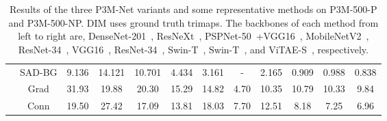 \documentclass[twocolumn]{svjour3}
\begin{document}
\begin{table*}[htb]
\begin{center}
{\begin{tabular}{c|c|ccccc|c|cccc}
&SAD-BG & 9.136&14.121 &10.701 &4.434&3.161  & - &2.165 & 0.909 & 0.988 & 0.838 \\
&Grad & 31.93& 19.88& 20.30&15.29 &14.82 &4.70 &10.35 & 10.79 & 10.33 & 9.84 \\
&Conn & 19.50& 27.42& 17.09&13.81& 18.03& 7.70& 12.51& 8.18 & 7.25 & 6.96 \\
\hline
\end{tabular}}
\end{center}
\caption{Results of the three P3M-Net variants and some representative methods on P3M-500-P and P3M-500-NP. DIM uses ground truth trimaps. The backbones of each method from left to right are, DenseNet-201~\citep{huang2017densely}, ResNeXt~\citep{resnext}, PSPNet-50~\citep{zhao2017pyramid}+VGG16~\citep{vgg16}, MobileNetV2~\citep{mobilenetv2}, ResNet-34~\citep{he2016deep}, VGG16~\citep{vgg16}, ResNet-34~\citep{he2016deep}, Swin-T~\citep{swin}, Swin-T~\citep{swin}, and ViTAE-S~\citep{vitae}, respectively.}
\label{tab:experiment}
\end{table*}
\end{document}
